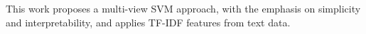 This work proposes a multi-view SVM approach, with the emphasis on simplicity and interpretability, and applies TF-IDF features from text data.